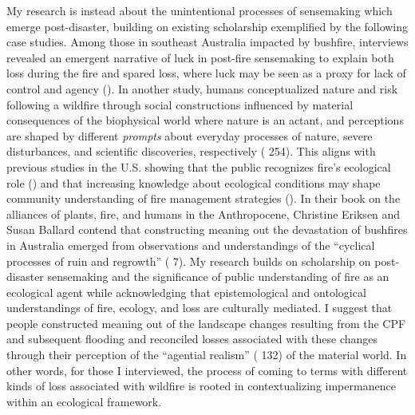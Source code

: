 \documentclass[
]{article}
\begin{document}
My research is instead about the unintentional processes of sensemaking which emerge post-disaster, building on existing scholarship exemplified by the following case studies. Among those in southeast Australia impacted by bushfire, interviews revealed an emergent narrative of luck in post-fire sensemaking to explain both loss during the fire and spared loss, where luck may be seen as a proxy for lack of control and agency (). In another study, humans conceptualized nature and risk following a wildfire through social constructions influenced by material consequences of the biophysical world where nature is an actant, and perceptions are shaped by different \emph{prompts} about everyday processes of nature, severe disturbances, and scientific discoveries, respectively ( 254). This aligns with previous studies in the U.S. showing that the public recognizes fire's ecological role () and that increasing knowledge about ecological conditions may shape community understanding of fire management strategies (). In their book on the alliances of plants, fire, and humans in the Anthropocene, Christine Eriksen and Susan Ballard contend that constructing meaning out the devastation of bushfires in Australia emerged from observations and understandings of the ``cyclical processes of ruin and regrowth'' ( 7). My research builds on scholarship on post-disaster sensemaking and the significance of public understanding of fire as an ecological agent while acknowledging that epistemological and ontological understandings of fire, ecology, and loss are culturally mediated. I suggest that people constructed meaning out of the landscape changes resulting from the CPF and subsequent flooding and reconciled losses associated with these changes through their perception of the ``agential realism'' ( 132) of the material world. In other words, for those I interviewed, the process of coming to terms with different kinds of loss associated with wildfire is rooted in contextualizing impermanence within an ecological framework.
\end{document}
